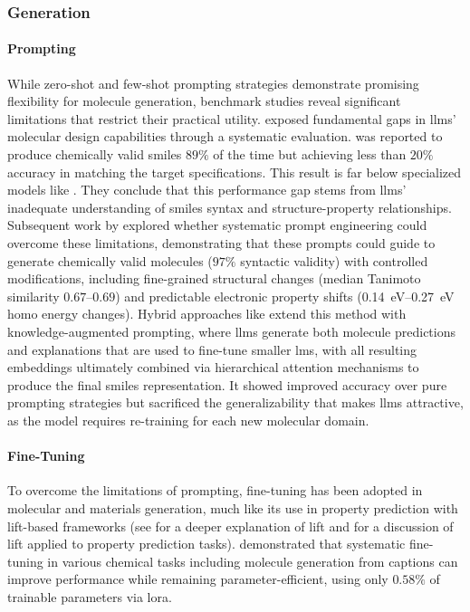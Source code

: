 \subsubsection{Generation}\label{sec:generation}

\paragraph{Prompting}
While zero-shot and few-shot prompting strategies demonstrate promising flexibility for molecule generation, benchmark studies \autocite{guo2023large} reveal significant limitations that restrict their practical utility. \textcite{guo2023large} exposed fundamental gaps in \glspl{llm}' molecular design capabilities through a systematic evaluation.  was reported to produce chemically valid \gls{smiles} $89\%$ of the time but achieving less than $20\%$ accuracy in matching the target specifications. 
This result is far below specialized models like \autocite{edwards2022translation}. 
They conclude that this performance gap stems from \glspl{llm}' inadequate understanding of \gls{smiles} syntax and structure-property relationships. 
Subsequent work by \textcite{bhattacharya2024large} explored whether systematic prompt engineering could overcome these limitations, demonstrating that these prompts could guide  to generate chemically valid molecules ($97\%$ syntactic validity) with controlled modifications, including fine-grained structural changes (median Tanimoto similarity $0.67$--$0.69$) and predictable electronic property shifts (\SIrange{0.14}{0.27}{eV} \gls{homo} energy changes). Hybrid approaches like  extend this method with knowledge-augmented prompting, where \glspl{llm} generate both molecule predictions and explanations that are used to fine-tune smaller \glspl{lm}, with all resulting embeddings ultimately combined via hierarchical attention mechanisms to produce the final \gls{smiles} representation\autocite{srinivas2024crossing}. 
It showed improved accuracy over pure prompting strategies but sacrificed the generalizability that makes \glspl{llm} attractive, as the model requires re-training for each new molecular domain. 

\paragraph{Fine-Tuning} To overcome the limitations of prompting, fine-tuning has been adopted in molecular and materials generation, much like its use in property prediction with \gls{lift}-based frameworks (see  for a deeper explanation of \gls{lift} and  for a discussion of \gls{lift} applied to property prediction tasks). \textcite{yu2024llasmol} demonstrated that systematic fine-tuning in various chemical tasks including molecule generation from captions can improve performance while remaining parameter-efficient, using only $0.58\%$ of trainable parameters via \gls{lora}.

